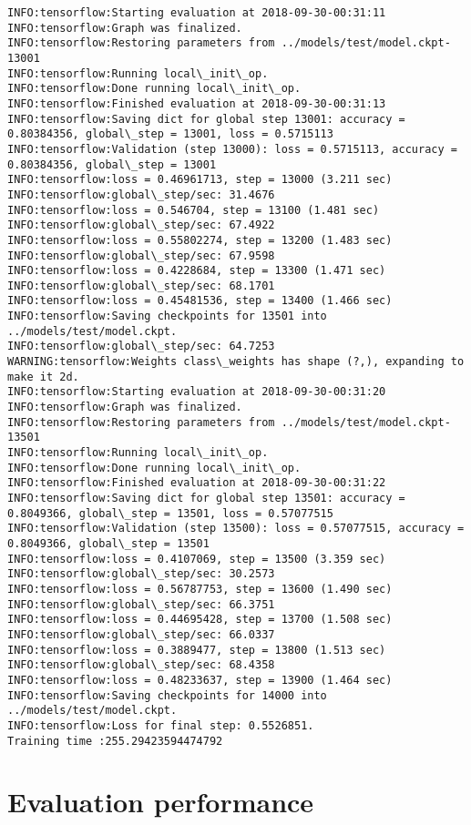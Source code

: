 \documentclass[11pt]{article}
\begin{document}
\begin{Verbatim}[commandchars=\\\{\}]
INFO:tensorflow:Starting evaluation at 2018-09-30-00:31:11
INFO:tensorflow:Graph was finalized.
INFO:tensorflow:Restoring parameters from ../models/test/model.ckpt-13001
INFO:tensorflow:Running local\_init\_op.
INFO:tensorflow:Done running local\_init\_op.
INFO:tensorflow:Finished evaluation at 2018-09-30-00:31:13
INFO:tensorflow:Saving dict for global step 13001: accuracy = 0.80384356, global\_step = 13001, loss = 0.5715113
INFO:tensorflow:Validation (step 13000): loss = 0.5715113, accuracy = 0.80384356, global\_step = 13001
INFO:tensorflow:loss = 0.46961713, step = 13000 (3.211 sec)
INFO:tensorflow:global\_step/sec: 31.4676
INFO:tensorflow:loss = 0.546704, step = 13100 (1.481 sec)
INFO:tensorflow:global\_step/sec: 67.4922
INFO:tensorflow:loss = 0.55802274, step = 13200 (1.483 sec)
INFO:tensorflow:global\_step/sec: 67.9598
INFO:tensorflow:loss = 0.4228684, step = 13300 (1.471 sec)
INFO:tensorflow:global\_step/sec: 68.1701
INFO:tensorflow:loss = 0.45481536, step = 13400 (1.466 sec)
INFO:tensorflow:Saving checkpoints for 13501 into ../models/test/model.ckpt.
INFO:tensorflow:global\_step/sec: 64.7253
WARNING:tensorflow:Weights class\_weights has shape (?,), expanding to make it 2d.
INFO:tensorflow:Starting evaluation at 2018-09-30-00:31:20
INFO:tensorflow:Graph was finalized.
INFO:tensorflow:Restoring parameters from ../models/test/model.ckpt-13501
INFO:tensorflow:Running local\_init\_op.
INFO:tensorflow:Done running local\_init\_op.
INFO:tensorflow:Finished evaluation at 2018-09-30-00:31:22
INFO:tensorflow:Saving dict for global step 13501: accuracy = 0.8049366, global\_step = 13501, loss = 0.57077515
INFO:tensorflow:Validation (step 13500): loss = 0.57077515, accuracy = 0.8049366, global\_step = 13501
INFO:tensorflow:loss = 0.4107069, step = 13500 (3.359 sec)
INFO:tensorflow:global\_step/sec: 30.2573
INFO:tensorflow:loss = 0.56787753, step = 13600 (1.490 sec)
INFO:tensorflow:global\_step/sec: 66.3751
INFO:tensorflow:loss = 0.44695428, step = 13700 (1.508 sec)
INFO:tensorflow:global\_step/sec: 66.0337
INFO:tensorflow:loss = 0.3889477, step = 13800 (1.513 sec)
INFO:tensorflow:global\_step/sec: 68.4358
INFO:tensorflow:loss = 0.48233637, step = 13900 (1.464 sec)
INFO:tensorflow:Saving checkpoints for 14000 into ../models/test/model.ckpt.
INFO:tensorflow:Loss for final step: 0.5526851.
Training time :255.29423594474792

    \end{Verbatim}

    \section{Evaluation performance}\label{evaluation-performance}
\end{document}
